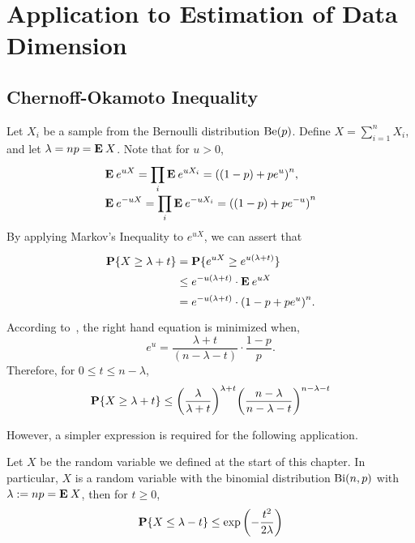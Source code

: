 \chapter{Application to Estimation of Data Dimension}

\section{Chernoff-Okamoto Inequality}

Let $X_i$ be a sample from the Bernoulli distribution $\Be(p)$. Define $ X = \sum_{i = 1}^n X_i$, and let $\lambda = np = \E X$. 
Note that for $u > 0$, 
  \begin{equation}\label{co:1}
    \everymath{\displaystyle}\arraycolsep=1.4pt\def\arraystretch{1.5}
  \begin{array}{l}
    \E e^{uX} = \prod_i \E e^{uX_i} = {((1-p) + p e^{u})}^n,\\
    \E e^{-uX} = \prod_i \E e^{-uX_i} = {((1-p) + p e^{-u})}^n
  \end{array} 
  \end{equation}
  By applying Markov's Inequality to $e^{uX}$, we can assert that
  \[\everymath{\displaystyle}\arraycolsep=1.4pt\def\arraystretch{1.5}
  \begin{array}{rcl}
    \P\{X \geq \lambda + t\} & = & \P\{e^{uX} \geq e^{u(\lambda + t)}\}\\
    & \leq & e^{-u(\lambda+t)} \cdot \E e^{uX}\\
    & = & e^{-u(\lambda+ t)} \cdot {(1-p + p e^{u})}^n. 
  \end{array} \] 
  According to~\cite{janson2002concentration}, the right hand equation is minimized when,
  \[ e^{u} = \frac{\lambda+t}{(n-\lambda-t)} \cdot \frac{1-p}{p}. \]
  Therefore, for $0 \leq t \leq n-\lambda$,
  \begin{equation}\label{co:2}
    \P\{X \geq \lambda + t\} \leq {\left(\frac{\lambda}{\lambda+t}\right)}^{\lambda + t} {\left(\frac{n-\lambda}{n-\lambda-t}\right)}^{n - \lambda - t}
  \end{equation}

  However, a simpler expression is required for the following application.

\begin{theorem}\label{co:T1}
  Let $X$ be the random variable we defined at the start of this chapter. In particular, $X$ is a random variable with the binomial distribution $\Bi(n,p)$ with $\lambda := np = \E X$, then for $t \geq 0$,
  \begin{equation}\label{co:3}
    \P\{X \leq \lambda - t\} \leq \exp\left(- \frac{t^2}{2\lambda}\right)
  \end{equation}
\end{theorem}


